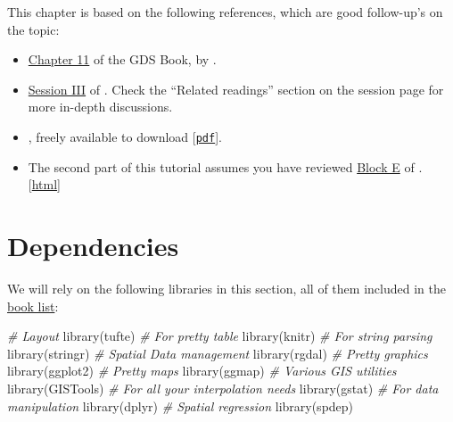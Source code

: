 \documentclass[
]{book}
\newenvironment{Shaded}{\begin{snugshade}}{\end{snugshade}}
\newcommand{\CommentTok}[1]{\textcolor[rgb]{0.56,0.35,0.01}{\textit{#1}}}
\newcommand{\FunctionTok}[1]{\textcolor[rgb]{0.00,0.00,0.00}{#1}}
\newcommand{\NormalTok}[1]{#1}
\providecommand{\tightlist}{%
  \setlength{\itemsep}{0pt}\setlength{\parskip}{0pt}}
\begin{document}
This chapter is based on the following references, which are good follow-up's on the topic:

\begin{itemize}
\tightlist
\item
  \href{https://geographicdata.science/book/notebooks/11_regression.html}{Chapter 11} of the GDS Book, by \citet{reyABwolf}.
\item
  \href{http://darribas.org/sdar_mini/notes/Class_03.html}{Session III} of \citet{arribas2014spatial}. Check the ``Related readings'' section on the session page for more in-depth discussions.
\item
  \citet{anselin2005spatial}, freely available to download {[}\href{http://csiss.org/GISPopSci/workshops/2011/PSU/readings/W15_Anselin2007.pdf}{\texttt{pdf}}{]}.
\item
  The second part of this tutorial assumes you have reviewed \href{https://darribas.org/gds_course/content/bE/concepts_E.html}{Block E} of \citet{darribas_gds_course}. {[}\href{https://darribas.org/gds_course/content/bE/concepts_E.html}{html}{]}
\end{itemize}

\hypertarget{dependencies-3}{%
\section{Dependencies}\label{dependencies-3}}

We will rely on the following libraries in this section, all of them included in the \protect\hyperlink{Dependency-list}{book list}:

\begin{Shaded}
\begin{Highlighting}[]
\CommentTok{\# Layout}
\FunctionTok{library}\NormalTok{(tufte)}
\CommentTok{\# For pretty table}
\FunctionTok{library}\NormalTok{(knitr)}
\CommentTok{\# For string parsing}
\FunctionTok{library}\NormalTok{(stringr)}
\CommentTok{\# Spatial Data management}
\FunctionTok{library}\NormalTok{(rgdal)}
\CommentTok{\# Pretty graphics}
\FunctionTok{library}\NormalTok{(ggplot2)}
\CommentTok{\# Pretty maps}
\FunctionTok{library}\NormalTok{(ggmap)}
\CommentTok{\# Various GIS utilities}
\FunctionTok{library}\NormalTok{(GISTools)}
\CommentTok{\# For all your interpolation needs}
\FunctionTok{library}\NormalTok{(gstat)}
\CommentTok{\# For data manipulation}
\FunctionTok{library}\NormalTok{(dplyr)}
\CommentTok{\# Spatial regression}
\FunctionTok{library}\NormalTok{(spdep)}
\end{Highlighting}
\end{Shaded}
\end{document}
